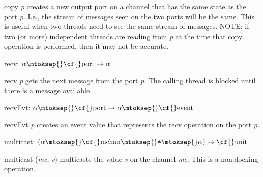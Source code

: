 \begin{descr}
\begin{speccomment}
\item {\cf \small copy \mbox{\cf \small \textit{p}}           } 
creates a new output port on a channel that has the same state as the 	  port \mbox{\cf \small \textit{p}}. 	  I.\-e., the stream of messages seen on the two ports will 	  be the same. 	  This is useful when two threads need to see the same stream of 	  messages. 	  NOTE: if two (or more) independent threads are reading from \mbox{\cf \small \textit{p}} 	  at the time that {\cf \small copy} operation is performed, then 	  it may not be accurate.     \end{speccomment}
\item {}{} {\cf recv: \(\alpha\mtoksep{}\mbox{\cf{}port}\rightarrow \alpha\)}\label{val-MULTICAST.recv}


\begin{speccomment}
\item {\cf \small recv \mbox{\cf \small \textit{p}}           } 
gets the next message from the port \mbox{\cf \small \textit{p}}. 	  The calling thread is blocked until there is a message available.     \end{speccomment}
\item {}{} {\cf recvEvt: \(\alpha\mtoksep{}\mbox{\cf{}port}\rightarrow \alpha\mtoksep{}\mbox{\cf{}event}\)}\label{val-MULTICAST.recvEvt}


\begin{speccomment}
\item {\cf \small recv\-Evt \mbox{\cf \small \textit{p}}           } 
creates an event value that represents the {\cf \small recv} operation 	  on the port \mbox{\cf \small \textit{p}}.     \end{speccomment}
\item {}{} {\cf multicast: \((\alpha\mtoksep{}\mbox{\cf{}mchan}\mtoksep{}\verb,*,\mtoksep{}\alpha)\rightarrow \mbox{\cf{}unit}\)}\label{val-MULTICAST.multicast}


\begin{speccomment}
\item {\cf \small multicast (\mbox{\cf \small \textit{mc}}, \mbox{\cf \small \textit{v}})           } 
multicasts the value \mbox{\cf \small \textit{v}} on the channel \mbox{\cf \small \textit{mc}}. 	  This is a nonblocking operation.\end{speccomment}
\end{descr}
